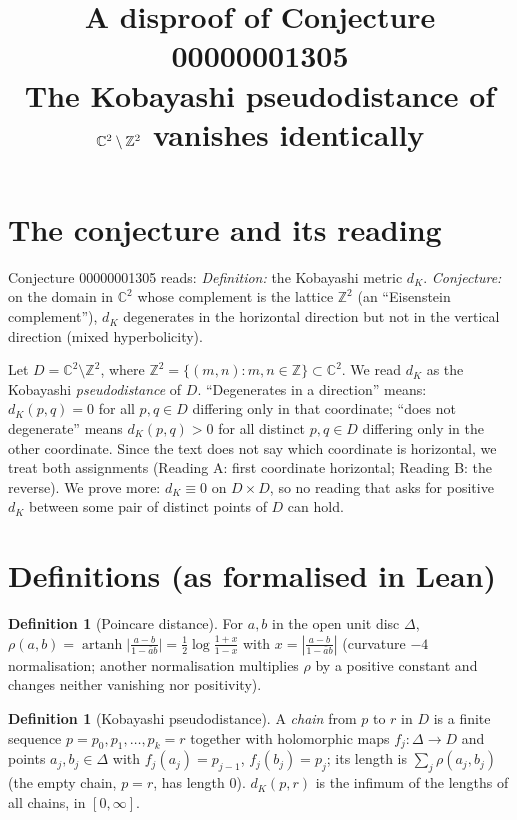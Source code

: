 \documentclass[11pt]{article}
\title{A disproof of Conjecture 00000001305\\[2pt]
\large The Kobayashi pseudodistance of $\C^2\setminus\Z^2$ vanishes identically}
\date{}
\theoremstyle{definition}
\newtheorem{definition}[theorem]{Definition}
\renewcommand{\_}{\oldus\allowbreak}
\newcommand{\C}{\mathbb{C}}
\newcommand{\Z}{\mathbb{Z}}
\begin{document}
\sloppy
\maketitle

\section{The conjecture and its reading}

Conjecture 00000001305 reads: \emph{Definition:} the Kobayashi metric $d_K$. \emph{Conjecture:} on the domain in
$\C^2$ whose complement is the lattice $\Z^2$ (an ``Eisenstein complement''), $d_K$ degenerates in the horizontal
direction but not in the vertical direction (mixed hyperbolicity).

Let $D=\C^2\setminus\Z^2$, where $\Z^2=\{(m,n):m,n\in\Z\}\subset\C^2$. We read $d_K$ as the Kobayashi
\emph{pseudodistance} of $D$. ``Degenerates in a direction'' means: $d_K(p,q)=0$ for all $p,q\in D$ differing only
in that coordinate; ``does not degenerate'' means $d_K(p,q)>0$ for all distinct $p,q\in D$ differing only in the
other coordinate. Since the text does not say which coordinate is horizontal, we treat both assignments
(Reading A: first coordinate horizontal; Reading B: the reverse). We prove more: $d_K\equiv 0$ on $D\times D$, so
no reading that asks for positive $d_K$ between some pair of distinct points of $D$ can hold.

\section{Definitions (as formalised in Lean)}

\begin{definition}[Poincare distance] For $a,b$ in the open unit disc $\Delta$,
$\rho(a,b)=\operatorname{artanh}\bigl|\tfrac{a-b}{1-\bar a b}\bigr|=\tfrac12\log\tfrac{1+x}{1-x}$ with
$x=|\tfrac{a-b}{1-\bar a b}|$ (curvature $-4$ normalisation; another normalisation multiplies $\rho$ by a positive
constant and changes neither vanishing nor positivity).
\end{definition}

\begin{definition}[Kobayashi pseudodistance] A \emph{chain} from $p$ to $r$ in $D$ is a finite sequence
$p=p_0,p_1,\dots,p_k=r$ together with holomorphic maps $f_j:\Delta\to D$ and points $a_j,b_j\in\Delta$ with
$f_j(a_j)=p_{j-1}$, $f_j(b_j)=p_j$; its length is $\sum_j\rho(a_j,b_j)$ (the empty chain, $p=r$, has length $0$).
$d_K(p,r)$ is the infimum of the lengths of all chains, in $[0,\infty]$.
\end{definition}
\end{document}

